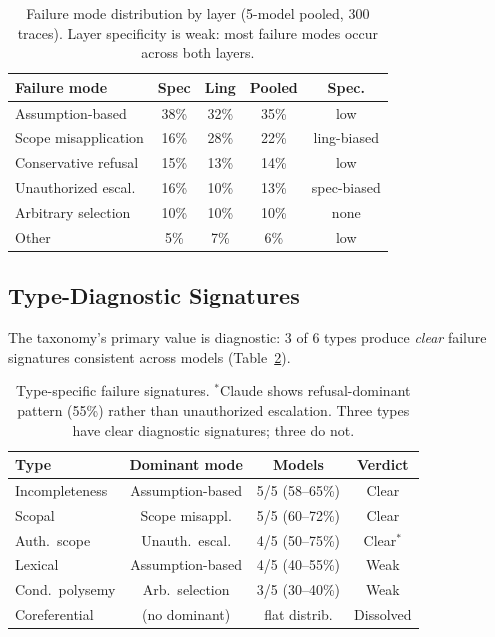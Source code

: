 \documentclass[11pt]{article}
\begin{document}
\begin{table}[t]
\centering
\small
\begin{tabular}{lcccc}
\toprule
\textbf{Failure mode} & \textbf{Spec} & \textbf{Ling} & \textbf{Pooled} & \textbf{Spec.} \\
\midrule
Assumption-based & 38\% & 32\% & 35\% & low \\
Scope misapplication & 16\% & 28\% & 22\% & ling-biased \\
Conservative refusal & 15\% & 13\% & 14\% & low \\
Unauthorized escal. & 16\% & 10\% & 13\% & spec-biased \\
Arbitrary selection & 10\% & 10\% & 10\% & none \\
Other & 5\% & 7\% & 6\% & low \\
\bottomrule
\end{tabular}
\caption{Failure mode distribution by layer (5-model pooled, 300 traces). Layer specificity is weak: most failure modes occur across both layers.}
\label{tab:failure_modes}
\end{table}

\subsection{Type-Diagnostic Signatures}

The taxonomy's primary value is diagnostic: 3 of 6 types produce \emph{clear} failure signatures consistent across models (Table~\ref{tab:signatures}).

\begin{table}[t]
\centering
\small
\begin{tabular}{lccc}
\toprule
\textbf{Type} & \textbf{Dominant mode} & \textbf{Models} & \textbf{Verdict} \\
\midrule
Incompleteness & Assumption-based & 5/5 (58--65\%) & Clear \\
Scopal & Scope misappl. & 5/5 (60--72\%) & Clear \\
Auth.\ scope & Unauth.\ escal. & 4/5 (50--75\%) & Clear$^*$ \\
Lexical & Assumption-based & 4/5 (40--55\%) & Weak \\
Cond.\ polysemy & Arb.\ selection & 3/5 (30--40\%) & Weak \\
Coreferential & (no dominant) & flat distrib. & Dissolved \\
\bottomrule
\end{tabular}
\caption{Type-specific failure signatures. $^*$Claude shows refusal-dominant pattern (55\%) rather than unauthorized escalation. Three types have clear diagnostic signatures; three do not.}
\label{tab:signatures}
\end{table}
\end{document}
